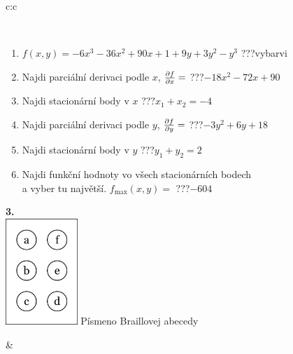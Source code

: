 \documentclass[10pt]{report}
\begin{document}
\begin{tabular}{c:c}
\begin{minipage}[c][104.5mm][t]{0.5\linewidth}
\begin{center}
\begin{minipage}{0.95\linewidth}
\begin{center}
\end{center}
\end{minipage}
\\[1mm]
\begin{minipage}{0.79\linewidth}
\begin{center}
\begin{varwidth}{\linewidth}
\begin{enumerate}
\normalsize
\item $f(x,y)=-6x^3-36x^2+90x+1+9y+3y^2-y^3$\quad \dotfill\; ???\;\dotfill \quad vybarvi
\item Najdi parciální derivaci podle $x$, $\pdv{f}{x}=$\quad \dotfill\; ???\;\dotfill \quad $-18x^2-72x+90$
\item Najdi stacionární body v $x$\quad \dotfill\; ???\;\dotfill \quad $x_1+x_2=-4$
\item Najdi parciální derivaci podle $y$, $\pdv{f}{y}=$\quad \dotfill\; ???\;\dotfill \quad $-3y^2+6y+18$
\item Najdi stacionární body v $y$\quad \dotfill\; ???\;\dotfill \quad $y_1+y_2=2$
\item Najdi funkční hodnoty vo všech stacionárních bodech \\ \phantom{xxxxxx} a vyber tu najvětší. $f_{\text{max}}(x,y)=$\quad \dotfill\; ???\;\dotfill \quad $-604$
\end{enumerate}
\end{varwidth}
\end{center}
\end{minipage}
\begin{minipage}{0.20\linewidth}
\begin{center}
{\Huge\bfseries 3.} \\[2mm]
\includegraphics[height=40mm]{../images/braille.png}
{\small Písmeno Braillovej abecedy}
\end{center}
\end{minipage}
\end{center}
\end{minipage}
&
\begin{minipage}[c][104.5mm][t]{0.5\linewidth}
\begin{center}

\end{center}
\end{minipage}
\end{tabular}
\end{document}
